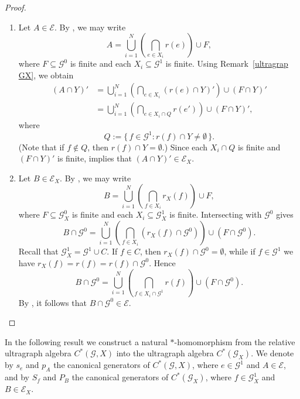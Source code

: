 \documentclass[12pt, reqno]{amsart}
\theoremstyle{definition}
\theoremstyle{remark}
\numberwithin{equation}{section}
\begin{document}
\begin{proof}
\begin{enumerate}
    \item Let $A \in \mathcal{E}$. By \cite[Lemma~2.12]{Tom2}, we may write
    \[
    A = \bigcup_{i=1}^N \left( \bigcap_{e \in X_i} r(e) \right) \cup F,
    \]
    where $F \subseteq \mathcal{G}^0$ is finite and each $X_i \subseteq \mathcal{G}^1$ is finite.  
    Using Remark~\ref{ultragrap GX}, we obtain
    \begin{align*}
        (A \cap Y)' 
        &= \bigcup_{i=1}^N \left( \bigcap_{e \in X_i} (r(e) \cap Y)' \right) \cup (F \cap Y)' \\
        &= \bigcup_{i=1}^N \left( \bigcap_{e \in X_i \cap Q} r(e') \right) \cup (F \cap Y)',
    \end{align*}
    where 
    \[
    Q := \{\, f \in \mathcal{G}^1 : r(f) \cap Y \neq \emptyset \,\}.
    \]
    (Note that if $f \notin Q$, then $r(f) \cap Y = \emptyset$.)  
    Since each $X_i \cap Q$ is finite and $(F \cap Y)'$ is finite, \cite[Lemma~2.12]{Tom2} implies that $(A \cap Y)' \in \mathcal{E}_X$.

    \item Let $B \in \mathcal{E}_X$. By \cite[Lemma~2.12]{Tom2}, we may write
    \[
    B = \bigcup_{i=1}^N \left( \bigcap_{f \in X_i} r_X(f) \right) \cup F,
    \]
    where $F \subseteq \mathcal{G}^0_X$ is finite and each $X_i \subseteq \mathcal{G}_X^1$ is finite.  
    Intersecting with $\mathcal{G}^0$ gives
    \[
    B \cap \mathcal{G}^0 = \bigcup_{i=1}^N \left( \bigcap_{f \in X_i} (r_X(f) \cap \mathcal{G}^0) \right) \cup (F \cap \mathcal{G}^0).
    \]
    Recall that $\mathcal{G}_X^1 = \mathcal{G}^1 \cup C$.  
    If $f \in C$, then $r_X(f) \cap \mathcal{G}^0 = \emptyset$, while if $f \in \mathcal{G}^1$ we have $r_X(f) = r(f) = r(f) \cap \mathcal{G}^0$.  
    Hence
    \[
    B \cap \mathcal{G}^0 = \bigcup_{i=1}^N \left( \bigcap_{f \in X_i \cap \mathcal{G}^1} r(f) \right) \cup (F \cap \mathcal{G}^0).
    \]
    By \cite[Lemma~2.12]{Tom2}, it follows that $B \cap \mathcal{G}^0 \in \mathcal{E}$.
\end{enumerate}
\end{proof}

    
In the following result we construct a natural $*$-homomorphism from the relative ultragraph algebra 
$C^*(\mathcal{G},X)$ into the ultragraph algebra $C^*(\mathcal{G}_X)$. We denote by $s_e$ and $p_A$ the canonical generators of 
$C^*(\mathcal{G},X)$, where $e \in \mathcal{G}^1$ and $A \in \mathcal{E}$, 
and by $S_f$ and $P_B$ the canonical generators of $C^*(\mathcal{G}_X)$, 
where $f \in \mathcal{G}_X^1$ and $B \in \mathcal{E}_X$.
\end{document}
